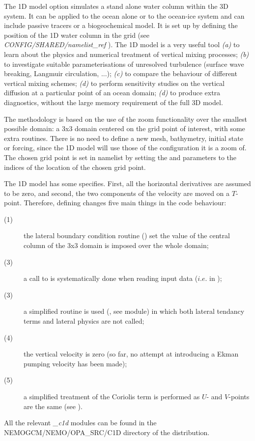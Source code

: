 \documentclass[../tex_main/NEMO_manual]{subfiles}
\begin{document}
The 1D model option simulates a stand alone water column within the 3D \NEMO system.
It can be applied to the ocean alone or to the ocean-ice system and can include passive tracers or a biogeochemical model.
It is set up by defining the position of the 1D water column in the grid
(see \textit{CONFIG/SHARED/namelist\_ref} ). 
The 1D model is a very useful tool
\textit{(a)} to learn about the physics and numerical treatment of vertical mixing processes;
\textit{(b)} to investigate suitable parameterisations of unresolved turbulence
(surface wave breaking, Langmuir circulation, ...);
\textit{(c)} to compare the behaviour of different vertical mixing schemes;
\textit{(d)} to perform sensitivity studies on the vertical diffusion at a particular point of an ocean domain;
\textit{(d)} to produce extra diagnostics, without the large memory requirement of the full 3D model.

The methodology is based on the use of the zoom functionality over the smallest possible domain:
a 3x3 domain centered on the grid point of interest, with some extra routines.
There is no need to define a new mesh, bathymetry, initial state or forcing,
since the 1D model will use those of the configuration it is a zoom of.
The chosen grid point is set in \textit{} namelist by
setting the  and  parameters to the indices of the location of the chosen grid point.

The 1D model has some specifies. First, all the horizontal derivatives are assumed to be zero,
and second, the two components of the velocity are moved on a $T$-point. 
Therefore, defining  changes five main things in the code behaviour: 
\begin{description}
\item[(1)]
  the lateral boundary condition routine () set the value of the central column of
  the 3x3 domain is imposed over the whole domain;
\item[(3)]
  a call to  is systematically done when reading input data ($i.e.$ in );
\item[(3)]
  a simplified  routine is used (, see  module) in which
  both lateral tendancy terms and lateral physics are not called;
\item[(4)]
  the vertical velocity is zero
  (so far, no attempt at introducing a Ekman pumping velocity has been made);
\item[(5)]
  a simplified treatment of the Coriolis term is performed as $U$- and $V$-points are the same
  (see ).
\end{description}
All the relevant \textit{\_c1d} modules can be found in the NEMOGCM/NEMO/OPA\_SRC/C1D directory of
the \NEMO distribution.
\end{document}
